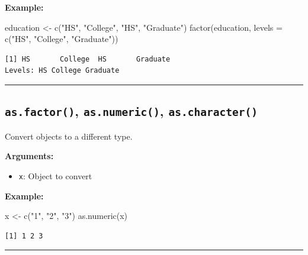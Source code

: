 \documentclass[
  letterpaper,
  DIV=11,
  numbers=noendperiod]{scrreprt}
\newenvironment{Shaded}{\begin{snugshade}}{\end{snugshade}}
\newcommand{\AttributeTok}[1]{\textcolor[rgb]{0.40,0.45,0.13}{#1}}
\newcommand{\FunctionTok}[1]{\textcolor[rgb]{0.28,0.35,0.67}{#1}}
\newcommand{\NormalTok}[1]{\textcolor[rgb]{0.00,0.23,0.31}{#1}}
\newcommand{\OtherTok}[1]{\textcolor[rgb]{0.00,0.23,0.31}{#1}}
\newcommand{\StringTok}[1]{\textcolor[rgb]{0.13,0.47,0.30}{#1}}
\providecommand{\tightlist}{%
  \setlength{\itemsep}{0pt}\setlength{\parskip}{0pt}}
\begin{document}
\textbf{Example:}

\begin{Shaded}
\begin{Highlighting}[]
\NormalTok{education }\OtherTok{\textless{}{-}} \FunctionTok{c}\NormalTok{(}\StringTok{"HS"}\NormalTok{, }\StringTok{"College"}\NormalTok{, }\StringTok{"HS"}\NormalTok{, }\StringTok{"Graduate"}\NormalTok{)}
\FunctionTok{factor}\NormalTok{(education, }\AttributeTok{levels =} \FunctionTok{c}\NormalTok{(}\StringTok{"HS"}\NormalTok{, }\StringTok{"College"}\NormalTok{, }\StringTok{"Graduate"}\NormalTok{))}
\end{Highlighting}
\end{Shaded}

\begin{verbatim}
[1] HS       College  HS       Graduate
Levels: HS College Graduate
\end{verbatim}

\begin{center}\rule{0.5\linewidth}{0.5pt}\end{center}

\subsection{\texorpdfstring{\texttt{as.factor()}, \texttt{as.numeric()},
\texttt{as.character()}}{as.factor(), as.numeric(), as.character()}}\label{as.factor-as.numeric-as.character}

Convert objects to a different type.

\textbf{Arguments:}

\begin{itemize}
\tightlist
\item
  \texttt{x}: Object to convert
\end{itemize}

\textbf{Example:}

\begin{Shaded}
\begin{Highlighting}[]
\NormalTok{x }\OtherTok{\textless{}{-}} \FunctionTok{c}\NormalTok{(}\StringTok{"1"}\NormalTok{, }\StringTok{"2"}\NormalTok{, }\StringTok{"3"}\NormalTok{)}
\FunctionTok{as.numeric}\NormalTok{(x)}
\end{Highlighting}
\end{Shaded}

\begin{verbatim}
[1] 1 2 3
\end{verbatim}

\begin{center}\rule{0.5\linewidth}{0.5pt}\end{center}
\end{document}
